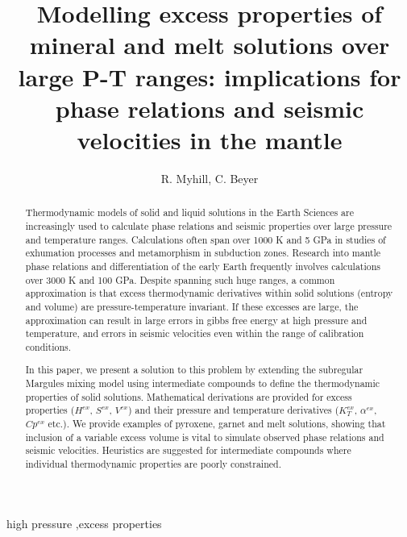 \documentclass[review]{elsarticle}
\begin{document}
\begin{frontmatter}

\title{Modelling excess properties of mineral and melt solutions over large P-T ranges: implications for phase relations and seismic velocities in the mantle}

\author{R. Myhill, C. Beyer}
\address{Bayerisches Geoinstitut, Universit\"{a}t Bayreuth, Universit\"{a}tsstrasse 30, 95447 Bayreuth, Germany}

\begin{abstract}
  Thermodynamic models of solid and liquid solutions in the Earth Sciences are increasingly used to calculate phase relations and seismic properties over large pressure and temperature ranges. Calculations often span over 1000 K and 5 GPa in studies of exhumation processes and metamorphism in subduction zones. Research into mantle phase relations and differentiation of the early Earth frequently involves calculations over 3000 K and 100 GPa. Despite spanning such huge ranges, a common approximation is that excess thermodynamic derivatives within solid solutions (entropy and volume) are pressure-temperature invariant. If these excesses are large, the approximation can result in large errors in gibbs free energy at high pressure and temperature, and errors in seismic velocities even within the range of calibration conditions. 

  In this paper, we present a solution to this problem by extending the subregular Margules mixing model using intermediate compounds to define the thermodynamic properties of solid solutions. Mathematical derivations are provided for excess properties ($H^{ex}$, $S^{ex}$, $V^{ex}$) and their pressure and temperature derivatives ($K_T^{ex}$, $\alpha^{ex}$, $Cp^{ex}$ etc.). We provide examples of pyroxene, garnet and melt solutions, showing that inclusion of a variable excess volume is vital to simulate observed phase relations and seismic velocities. Heuristics are suggested for intermediate compounds where individual thermodynamic properties are poorly constrained.


\end{abstract}

\begin{keyword}
high pressure \sep excess properties
\end{keyword}

\end{frontmatter}
\end{document}
